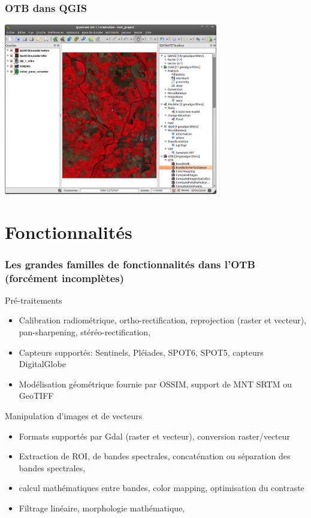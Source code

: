 \documentclass[8pt]{beamer}
\begin{document}
\begin{frame}
\frametitle{OTB dans QGIS}
\begin{minipage}[t][6cm][t]{\textwidth}
\begin{center}
\includegraphics[width=0.7\textwidth]{images/otb_qgis.png}
\end{center}
\end{minipage}
\end{frame}

\section{Fonctionnalités}

\begin{frame}
\frametitle{Les grandes familles de fonctionnalités dans l'OTB (forcément incomplètes)}

\begin{block}{Pré-traitements}
\begin{itemize}
\item Calibration radiométrique, ortho-rectification, reprojection (raster et vecteur), pan-sharpening, stéréo-rectification,
\item Capteurs supportés: Sentinels, Pléiades, SPOT6, SPOT5, capteurs DigitalGlobe
\item Modélisation géométrique fournie par OSSIM, support de MNT SRTM ou GeoTIFF
\end{itemize}
\end{block}

\begin{block}{Manipulation d'images et de vecteurs}
\begin{itemize}
\item Formats supportés par Gdal (raster et vecteur), conversion raster/vecteur
\item Extraction de ROI, de bandes spectrales, concaténation ou séparation des bandes spectrales,
\item calcul mathématiques entre bandes, color mapping, optimisation du contraste
\item Filtrage linéaire, morphologie mathématique,
\end{itemize}
\end{block}
\end{frame}
\end{document}
